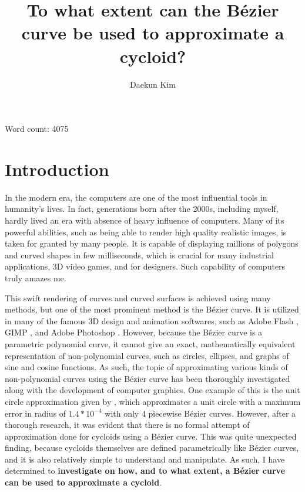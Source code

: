 \documentclass[11pt, oneside, appendixprefix=Appendix]{article}
\title{To what extent can the B\'ezier curve be used to approximate a cycloid?}
\author{Daekun Kim}
\theoremstyle{definition}
\numberwithin{figure}{section}
\begin{document}
\begin{titlingpage}
\maketitle
Word count: 4075
\end{titlingpage}
\tableofcontents
\newpage

\section{Introduction}
	In the modern era, the computers are one of the most influential tools in humanity's lives. In fact, generations born after the 2000s, including myself, hardly lived an era with absence of heavy influence of computers. Many of its powerful abilities, such as being able to render high quality realistic images, is taken for granted by many people. It is capable of displaying millions of polygons and curved shapes in few milliseconds, which is crucial for many industrial applications, 3D video games, and for designers. Such capability of computers truly amazes me. 

This swift rendering of curves and curved surfaces is achieved using many methods, but one of the most prominent method is the B\'ezier curve. It is utilized in many of the famous 3D design and animation softwares, such as Adobe Flash , GIMP , and Adobe Photoshop . However, because the B\'ezier curve is a parametric polynomial curve, it cannot give an exact, mathematically equivalent representation of non-polynomial curves, such as circles, ellipses, and graphs of sine and cosine functions. As such, the topic of approximating various kinds of non-polynomial curves using the B\'ezier curve has been thoroughly investigated along with the development of computer graphics. One example of this is the unit circle approximation given by , which approximates a unit circle with a maximum error in radius of $1.4*10^{-4}$ with only 4 piecewise B\'ezier curves. However, after a thorough research, it was evident that there is no formal attempt of approximation done for cycloids using a B\'ezier curve. This was quite unexpected finding, because cycloids themselves are defined parametrically like B\'ezier curves, and it is also relatively simple to understand and manipulate. As such, I have determined to \textbf{investigate on how, and to what extent, a B\'ezier curve can be used to approximate a cycloid}.
\end{document}
